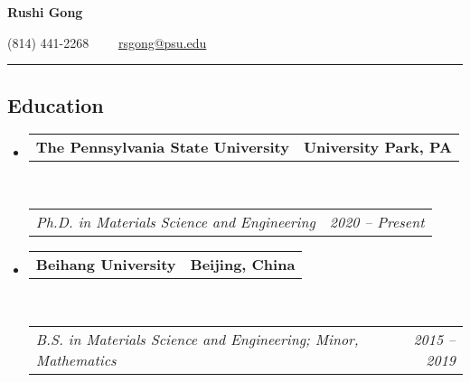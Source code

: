\documentclass[10pt,letterpaper]{article}
\makeatletter
\newcommand{\headerrow}[2]
{\begin{tabular*}{\linewidth}{l@{\extracolsep{\fill}}r}
  #1 &
  #2 \\
\end{tabular*}}
\makeatother
\begin{document}
\begin{center}
{\LARGE \textbf{Rushi Gong}}



(814) 441-2268\ \ \textbullet
\ \ \href{mailto:rsgong@psu.edu}{rsgong@psu.edu}
\end{center}


\hrule
\vspace{-0.6em}
\subsection*{Education}

\begin{itemize}
  \parskip=0.1em

  \item
  \headerrow
    {\textbf{The Pennsylvania State University}}
    {\textbf{University Park, PA}}
  \\
  \headerrow
    {\emph{Ph.D. in Materials Science and Engineering}}
    {\emph{2020 -- Present}}


  \item
  \headerrow
    {\textbf{Beihang University}}
    {\textbf{Beijing, China}}
  \\
  \headerrow
    {\emph{B.S. in Materials Science and Engineering; Minor, Mathematics}}
    {\emph{2015 -- 2019}}

\end{itemize}


\end{document}
